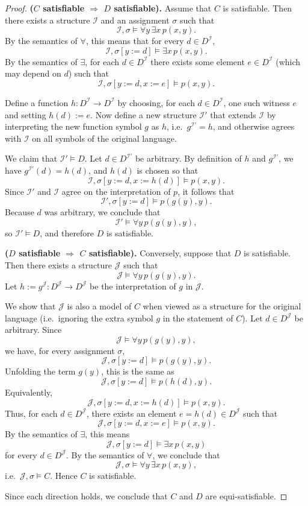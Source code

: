 \documentclass{article}
\theoremstyle{plain}
\theoremstyle{definition}
\theoremstyle{remark}
\begin{document}
\begin{proof}
\textbf{($C$ satisfiable $\Rightarrow$ $D$ satisfiable).}
Assume that $C$ is satisfiable.
Then there exists a structure $\mathcal{I}$ and an assignment $\sigma$
such that
\[
\mathcal{I},\sigma \models \forall y\,\exists x\,p(x,y).
\]
By the semantics of $\forall$, this means that for every $d \in D^{\mathcal{I}}$,
\[
\mathcal{I},\sigma[y := d] \models \exists x\,p(x,y).
\]
By the semantics of $\exists$, for each $d \in D^{\mathcal{I}}$ there exists
some element $e \in D^{\mathcal{I}}$ (which may depend on $d$) such that
\[
\mathcal{I},\sigma[y := d, x := e] \models p(x,y).
\]

Define a function $h : D^{\mathcal{I}} \to D^{\mathcal{I}}$ by choosing, for
each $d \in D^{\mathcal{I}}$, one such witness $e$ and setting $h(d) := e$.
Now define a new structure $\mathcal{I}'$ that extends $\mathcal{I}$ by
interpreting the new function symbol $g$ as $h$, i.e.\ $g^{\mathcal{I}'} = h$,
and otherwise agrees with $\mathcal{I}$ on all symbols of the original language.

We claim that $\mathcal{I}' \models D$.
Let $d \in D^{\mathcal{I}'}$ be arbitrary.
By definition of $h$ and $g^{\mathcal{I}'}$, we have
$g^{\mathcal{I}'}(d) = h(d)$, and $h(d)$ is chosen so that
\[
\mathcal{I},\sigma[y := d, x := h(d)] \models p(x,y).
\]
Since $\mathcal{I}'$ and $\mathcal{I}$ agree on the interpretation of $p$,
it follows that
\[
\mathcal{I}',\sigma[y := d] \models p(g(y),y).
\]
Because $d$ was arbitrary, we conclude that
\[
\mathcal{I}' \models \forall y\,p(g(y),y),
\]
so $\mathcal{I}' \models D$, and therefore $D$ is satisfiable.

\bigskip

\textbf{($D$ satisfiable $\Rightarrow$ $C$ satisfiable).}
Conversely, suppose that $D$ is satisfiable.
Then there exists a structure $\mathcal{J}$ such that
\[
\mathcal{J} \models \forall y\,p(g(y),y).
\]
Let $h := g^{\mathcal{J}} : D^{\mathcal{J}} \to D^{\mathcal{J}}$ be the
interpretation of $g$ in $\mathcal{J}$.

We show that $\mathcal{J}$ is also a model of $C$ when viewed as a structure
for the original language (i.e.\ ignoring the extra symbol $g$ in the
statement of $C$).
Let $d \in D^{\mathcal{J}}$ be arbitrary.
Since
\[
\mathcal{J} \models \forall y\,p(g(y),y),
\]
we have, for every assignment $\sigma$,
\[
\mathcal{J},\sigma[y := d] \models p(g(y),y).
\]
Unfolding the term $g(y)$, this is the same as
\[
\mathcal{J},\sigma[y := d] \models p(h(d),y).
\]
Equivalently,
\[
\mathcal{J},\sigma[y := d, x := h(d)] \models p(x,y).
\]
Thus, for each $d \in D^{\mathcal{J}}$, there exists an element
$e = h(d) \in D^{\mathcal{J}}$ such that
\[
\mathcal{J},\sigma[y := d, x := e] \models p(x,y).
\]
By the semantics of $\exists$, this means
\[
\mathcal{J},\sigma[y := d] \models \exists x\,p(x,y)
\]
for every $d \in D^{\mathcal{J}}$.
By the semantics of $\forall$, we conclude that
\[
\mathcal{J},\sigma \models \forall y\,\exists x\,p(x,y),
\]
i.e.\ $\mathcal{J},\sigma \models C$.
Hence $C$ is satisfiable.

\bigskip

Since each direction holds, we conclude that $C$ and $D$ are equi-satisfiable.
\end{proof}
\end{document}
